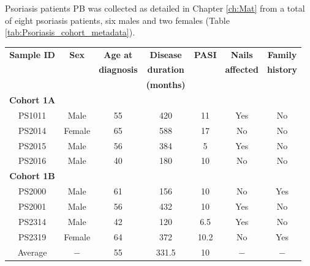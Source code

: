Psoriasis patients PB was collected as detailed in Chapter \ref{ch:Mat} from a total of eight psoriasis patients, six males and two females (Table \ref{tab:Psoriasis_cohort_metadata}). 

		
\begin{table}[htbp]
\centering
\begin{tabular}{@{} c c c c c c c}
\toprule
\textbf{ Sample ID} & \textbf{Sex} & \textbf{Age at}    & \textbf{Disease}  & \textbf{PASI}  &\textbf{Nails}      & \textbf{Family} \\
                    &              & \textbf{diagnosis} & \textbf{duration} &                & \textbf{affected}  & \textbf{history} \\
										&							 &										&	\textbf{(months)}	&								 &                    &                  \\
\midrule
\midrule
\textbf{Cohort 1A} & & & & & & \\
\midrule
PS1011	& Male	 & 55 & 420 & 11	 & Yes	 & No \\
PS2014	& Female & 65	& 588	& 17	 & No	   & No \\
PS2015	& Male	 & 56	& 384	& 5	   & Yes   & No \\
PS2016	& Male	 & 40	& 180	& 10	 & No    & No \\
\midrule
\midrule
\textbf{Cohort 1B} & & & & & & \\
\midrule
PS2000	& Male	 & 61	& 156	& 10	 & No	   & Yes \\
PS2001	& Male	 & 56	& 432	& 10	 & Yes	 & No \\
PS2314	& Male	 & 42	& 120	& 6.5	 & Yes   & No \\
PS2319	& Female & 64	& 372	& 10.2 & No    & Yes \\
\midrule
Average		& $-$	 & 55 & 331.5 & 10 & $-$   & $-$ \\																			
\bottomrule
\end{tabular}
\medskip %

\end{table}
